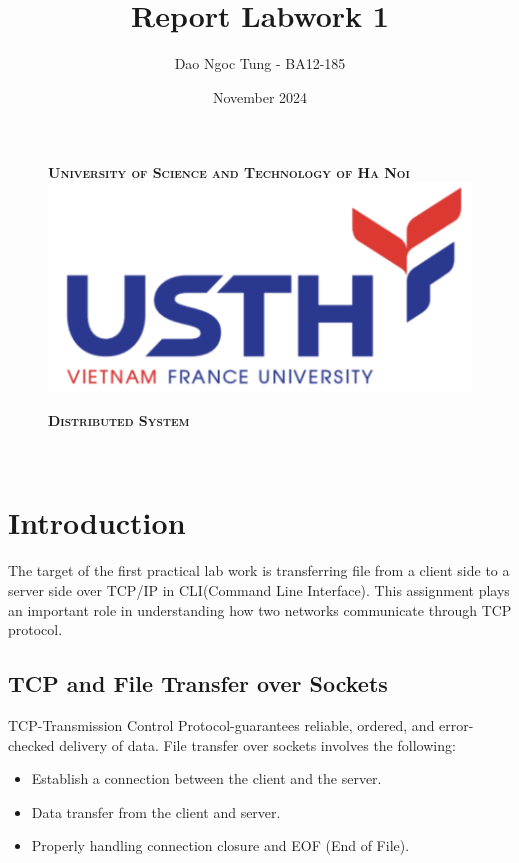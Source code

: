 \documentclass{article}
\title{Report Labwork 1}
\author{
    Dao Ngoc Tung - BA12-185\\  
}
\date{November 2024}
\begin{document}
\begin{figure}[H]
    \textsc{\large \bfseries University of Science and Technology of Ha Noi}\\[0.5cm]
    \centering
    \includegraphics[width=0.8\linewidth]{usth.png}
    \label{fig:project-overview}

    \vspace{1cm}
 
    \vspace{1cm}

    \textsc{\Large \bfseries Distributed System}\\[1cm]
    
\end{figure}


\vspace{1cm}
\begin{center}
    \huge \textbf{\thetitle} \\[0.5cm]
    \Large \theauthor [0.5cm]
    \large \thedate
\end{center}

\vspace{4cm}
\newpage
\tableofcontents

\newpage
\section{Introduction}
The target of the first practical lab work is transferring file from a client side to a server side over TCP/IP in CLI(Command Line Interface). This assignment plays an important role in understanding how two networks communicate through TCP protocol.

\subsection{TCP and File Transfer over Sockets}
TCP-Transmission Control Protocol-guarantees reliable, ordered, and error-checked delivery of data. File transfer over sockets involves the following:
\begin{itemize}
    \item Establish a connection between the client and the server.
    \item Data transfer from the client and server.
    \item Properly handling connection closure and EOF (End of File).
\end{itemize}
\end{document}
